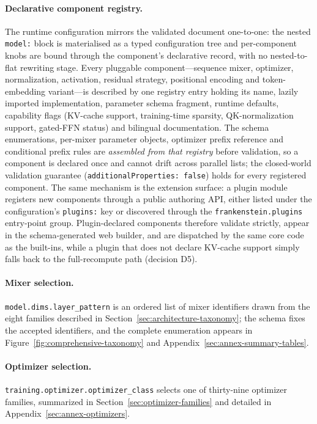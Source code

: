 \paragraph{Declarative component registry.} The runtime configuration mirrors the validated document one-to-one: the nested \texttt{model:} block is materialised as a typed configuration tree and per-component knobs are bound through the component's declarative record, with no nested-to-flat rewriting stage. Every pluggable component---sequence mixer, optimizer, normalization, activation, residual strategy, positional encoding and token-embedding variant---is described by one registry entry holding its name, lazily imported implementation, parameter schema fragment, runtime defaults, capability flags (KV-cache support, training-time sparsity, QK-normalization support, gated-FFN status) and bilingual documentation. The schema enumerations, per-mixer parameter objects, optimizer prefix reference and conditional prefix rules are \emph{assembled from that registry} before validation, so a component is declared once and cannot drift across parallel lists; the closed-world validation guarantee (\texttt{additionalProperties:~false}) holds for every registered component. The same mechanism is the extension surface: a plugin module registers new components through a public authoring API, either listed under the configuration's \texttt{plugins:} key or discovered through the \texttt{frankenstein.plugins} entry-point group. Plugin-declared components therefore validate strictly, appear in the schema-generated web builder, and are dispatched by the same core code as the built-ins, while a plugin that does not declare KV-cache support simply falls back to the full-recompute path (decision D5).

\paragraph{Mixer selection.} \texttt{model.dims.layer\_pattern} is an ordered list of mixer identifiers drawn from the eight families described in Section~\ref{sec:architecture-taxonomy}; the schema fixes the accepted identifiers, and the complete enumeration appears in Figure~\ref{fig:comprehensive-taxonomy} and Appendix~\ref{sec:annex-summary-tables}.

\paragraph{Optimizer selection.} \texttt{training.optimizer.optimizer\_class} selects one of thirty-nine optimizer families, summarized in Section~\ref{sec:optimizer-families} and detailed in Appendix~\ref{sec:annex-optimizers}.

